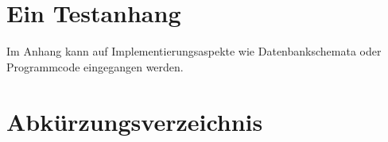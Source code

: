 \documentclass[listof=totocnumbered, bibliography=totocnumbered]{scrreprt}
\begin{document}
  \appendix
  
  \chapter{Ein Testanhang}
  
  Im Anhang kann auf Implementierungsaspekte wie Datenbankschemata
  oder Programmcode eingegangen werden.
  
  
  \chapter{Abkürzungsverzeichnis}
  \begin{acronym}
    \setlength{\itemsep}{-\parsep}
  \end{acronym}
  
  
  \listoffigures
  
  
  \listoftables
  
  
  
  \cleardoublepage
  
\end{document}
